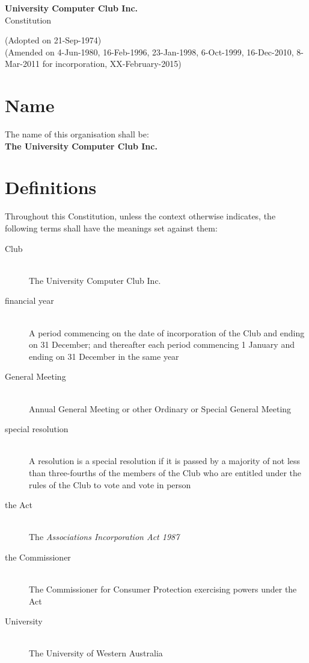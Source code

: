\documentclass[11pt]{article} %
\makeatletter
\renewcommand\tableofcontents{%
    \@starttoc{toc}%
}
\makeatother
\begin{document}
\noindent
\begin{center}
\textbf{\LARGE{University Computer Club Inc.}}\\
\Large{Constitution}
\end{center}

\noindent
\small{(Adopted on 21-Sep-1974)\\
(Amended on 4-Jun-1980, 16-Feb-1996, 23-Jan-1998, 6-Oct-1999, 16-Dec-2010, 8-Mar-2011 for incorporation, XX-February-2015)\\}

\begingroup
	\let\cleardoublepage\clearpage
	\def\addvspace#1{}
	\tableofcontents
\endgroup


\section{Name}
\begin{description}
	\item The name of this organisation shall be: \hfill \\
		\large{\textbf{The University Computer Club Inc.}}
\end{description}

\section{Definitions}
Throughout this Constitution, unless the context otherwise indicates, the following terms shall have the meanings set against them:
\begin{description}
	\item[Club] \hfill \\
		The University Computer Club Inc.
	\item[financial year] \hfill \\
		A period commencing on the date of incorporation of the Club and ending on 31 December; and thereafter each period commencing 1 January and ending on 31 December in the same year
	\item[General Meeting] \hfill \\
		Annual General Meeting or other Ordinary or Special General Meeting
	\item[special resolution] \hfill \\
		A resolution is a special resolution if it is passed by a majority of not less than three-fourths of the members of the Club who are entitled under the rules of the Club to vote and vote in person
	\item[the Act] \hfill \\
		The \emph{Associations Incorporation Act 1987}
	\item[the Commissioner] \hfill \\
		The Commissioner for Consumer Protection exercising powers under the Act
	\item[University] \hfill \\
		The University of Western Australia
\end{description}
\end{document}
